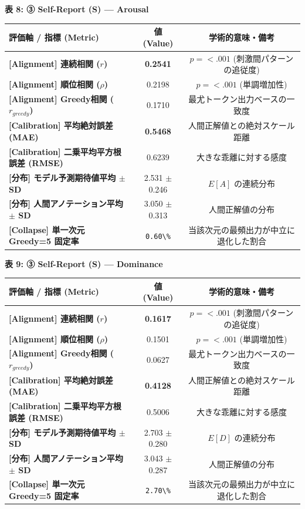 \textbf{表 8: ③ Self-Report (S) — Arousal}
\begin{center}
\small
\begin{tabular}{lcc}
\toprule
\textbf{評価軸 / 指標 (Metric)} & \textbf{値 (Value)} & \textbf{学術的意味・備考} \\
\midrule
\textbf{[Alignment] 連続相関 ($r$)} & \textbf{0.2541} & $p = <.001 $ (刺激間パターンの追従度) \\
\textbf{[Alignment] 順位相関 ($\rho$)} & 0.2198 & $p = <.001 $ (単調増加性) \\
\textbf{[Alignment] Greedy相関 ($r_{greedy}$)} & 0.1710 & 最尤トークン出力ベースの一致度 \\
\textbf{[Calibration] 平均絶対誤差 (MAE)} & \textbf{0.5468} & 人間正解値との絶対スケール距離 \\
\textbf{[Calibration] 二乗平均平方根誤差 (RMSE)} & 0.6239 & 大きな乖離に対する感度 \\
\textbf{[分布] モデル予測期待値平均 $\pm$ SD} & 2.531 $\pm$ 0.246 & $E[A]$ の連続分布 \\
\textbf{[分布] 人間アノテーション平均 $\pm$ SD} & 3.050 $\pm$ 0.313 & 人間正解値の分布 \\
\textbf{[Collapse] 単一次元 Greedy=5 固定率} & \texttt{0.60\textbackslash{}\%} & 当該次元の最頻出力が中立に退化した割合 \\
\bottomrule
\end{tabular}
\end{center}


\textbf{表 9: ③ Self-Report (S) — Dominance}
\begin{center}
\small
\begin{tabular}{lcc}
\toprule
\textbf{評価軸 / 指標 (Metric)} & \textbf{値 (Value)} & \textbf{学術的意味・備考} \\
\midrule
\textbf{[Alignment] 連続相関 ($r$)} & \textbf{0.1617} & $p = <.001 $ (刺激間パターンの追従度) \\
\textbf{[Alignment] 順位相関 ($\rho$)} & 0.1501 & $p = <.001 $ (単調増加性) \\
\textbf{[Alignment] Greedy相関 ($r_{greedy}$)} & 0.0627 & 最尤トークン出力ベースの一致度 \\
\textbf{[Calibration] 平均絶対誤差 (MAE)} & \textbf{0.4128} & 人間正解値との絶対スケール距離 \\
\textbf{[Calibration] 二乗平均平方根誤差 (RMSE)} & 0.5006 & 大きな乖離に対する感度 \\
\textbf{[分布] モデル予測期待値平均 $\pm$ SD} & 2.703 $\pm$ 0.280 & $E[D]$ の連続分布 \\
\textbf{[分布] 人間アノテーション平均 $\pm$ SD} & 3.043 $\pm$ 0.287 & 人間正解値の分布 \\
\textbf{[Collapse] 単一次元 Greedy=5 固定率} & \texttt{2.70\textbackslash{}\%} & 当該次元の最頻出力が中立に退化した割合 \\
\bottomrule
\end{tabular}
\end{center}


